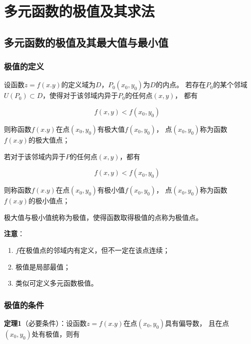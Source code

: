 \documentclass[12pt, a4paper]{article}
\numberwithin{equation}{section}
\begin{document}
\section{多元函数的极值及其求法}

\subsection{多元函数的极值及其最大值与最小值}

\subsubsection{极值的定义}

    设函数\(z=f\left(x.y\right)\)的定义域为\(D\)，\(P_0\left(x_0,y_0\right)\)为\(D \)的内点。
    若存在\(P_0\)的某个邻域\(U\left(P_0\right) \subset D\)，使得对于该邻域内异于\(P_0\)的任何点\(\left(x,y\right)\)，
    都有

    \[
        f\left(x,y\right) < f\left(x_0,y_0\right)
    \]

    则称函数\(f\left(x.y\right)\)在点\(\left(x_0,y_0\right)\)有极大值\(f\left(x_0,y_0\right)\)，
    点\(\left(x_0,y_0\right)\)称为函数\(f\left(x.y\right)\)的极大值点；
    
    
    若对于该邻域内异于\(P\)的任何点\(\left(x,y\right)\)，都有
    
    \[
        f\left(x,y\right) < f\left(x_0,y_0\right)
    \]

    则称函数\(f\left(x.y\right)\)在点\(\left(x_0,y_0\right)\)有极小值\(f\left(x_0,y_0\right)\)，
    点\(\left(x_0,y_0\right)\)称为函数\(f\left(x.y\right)\)的极小值点；

    极大值与极小值统称为极值，使得函数取得极值的点称为极值点。

    \textbf{注意}：

    \begin{enumerate}
        \item \(f \)在极值点的邻域内有定义，但不一定在该点连续；
        \item 极值是局部最值；
        \item 类似可定义多元函数极值。
    \end{enumerate}
 
\subsubsection{极值的条件}
    
    \textbf{定理1}（必要条件）：设函数\(z=f\left(x.y\right)\)在点\(\left(x_0,y_0\right)\)具有偏导数，
    且在点\(\left(x_0,y_0\right)\)处有极值，则有
\end{document}
